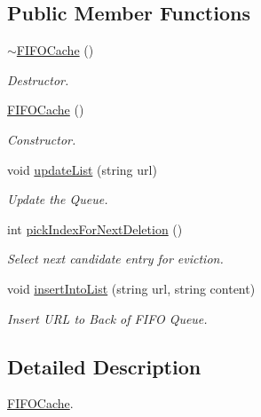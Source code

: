 \subsection*{\-Public \-Member \-Functions}
\begin{DoxyCompactItemize}
\item 
\hypertarget{classFIFOCache_a1ae7ca5adab1d06c341510f1f2fee299}{\hyperlink{classFIFOCache_a1ae7ca5adab1d06c341510f1f2fee299}{$\sim$\-F\-I\-F\-O\-Cache} ()}\label{classFIFOCache_a1ae7ca5adab1d06c341510f1f2fee299}

\begin{DoxyCompactList}\small\item\em \-Destructor. \end{DoxyCompactList}\item 
\hypertarget{classFIFOCache_a12486ada6ceb70c77f3cd4f40f295928}{\hyperlink{classFIFOCache_a12486ada6ceb70c77f3cd4f40f295928}{\-F\-I\-F\-O\-Cache} ()}\label{classFIFOCache_a12486ada6ceb70c77f3cd4f40f295928}

\begin{DoxyCompactList}\small\item\em \-Constructor. \end{DoxyCompactList}\item 
void \hyperlink{classFIFOCache_a73b7632a308ed4813d8c7e03cf597d47}{update\-List} (string url)
\begin{DoxyCompactList}\small\item\em \-Update the \-Queue. \end{DoxyCompactList}\item 
int \hyperlink{classFIFOCache_a16f6449563e0e83af7069406a14089e9}{pick\-Index\-For\-Next\-Deletion} ()
\begin{DoxyCompactList}\small\item\em \-Select next candidate entry for eviction. \end{DoxyCompactList}\item 
void \hyperlink{classFIFOCache_ae1255739ccdb46db5a3c5bb9cbc3d868}{insert\-Into\-List} (string url, string content)
\begin{DoxyCompactList}\small\item\em \-Insert \-U\-R\-L to \-Back of \-F\-I\-F\-O \-Queue. \end{DoxyCompactList}\end{DoxyCompactItemize}


\subsection{\-Detailed \-Description}
\hyperlink{classFIFOCache}{\-F\-I\-F\-O\-Cache}. 

